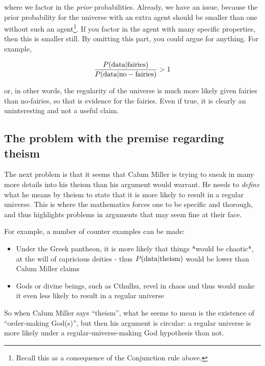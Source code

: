 \documentclass{tufte-book}
\begin{document}
where we factor in the \emph{prior} probabilities. Already, we have an
issue, because the prior probability for the universe with an extra
agent should be smaller than one without such an
agent\footnote{Recall this as a consequence of the Conjunction rule above.}.
If you factor in the agent with many specific properties, then this is
smaller still. By omitting this part, you could argue for anything. For
example,

\begin{eqnarray*}
\frac{P({\rm data}|{\rm fairies})}{P({\rm data}|{\rm no-fairies})}>1
\end{eqnarray*}

or, in other words, the regularity of the universe is much more likely
given fairies than no-fairies, so that is evidence for the fairies. Even
if true, it is clearly an uninteresting and not a useful claim.

\subsection{The problem with the premise regarding
theism}\label{the-problem-with-the-premise-regarding-theism}

The next problem is that it seems that Calum Miller is trying to sneak
in many more details into his theism than his argument would warrant. He
needs to \emph{define} what he means by theism to state that it is more
likely to result in a regular universe. This is where the mathematics
forces one to be specific and thorough, and thus highlights problems in
arguments that may seem fine at their face.

For example, a number of counter examples can be made:

\begin{itemize}
\item  Under the Greek pantheon, it is more likely that things *would be chaotic*, at the will of capricious deities - thus $P({\rm data}|{\rm theism})$ would be lower than Calum Miller claims
\item  Gods or divine beings, such as Cthulhu, revel in chaos and thus would make it even less likely to result in a regular universe
\end{itemize}

So when Calum Miller says ``theism'', what he seems to mean is the
existence of ``order-making God(s)'', but then his argument is circular:
a regular universe is more likely under a regular-universe-making God
hypothesis than not.
\end{document}
